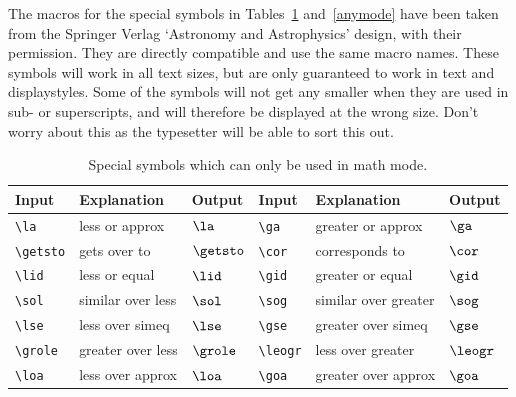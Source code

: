 \documentclass{gji}
\begin{document}
The macros for the special symbols in Tables~\ref{mathmode}
and~\ref{anymode}
have been taken from the Springer Verlag `Astronomy and Astrophysics'
design, with their permission. They are directly compatible and use the
same macro names.
These symbols will work in all text sizes, but are only guaranteed to work
in text and displaystyles. Some of the symbols will not get any smaller
when they are used in sub- or superscripts, and will therefore be
displayed at the wrong size. Don't worry about this as the typesetter
will be able to sort this out.
%
\begin{table}
\begin{minipage}{106mm}
\caption{Special symbols which can only be used in math mode.}
\label{mathmode}
\begin{tabular}{@{}llllll}
Input & Explanation & Output & Input & Explanation & Output\\
\hline
\verb"\la"     & less or approx       & $\la$     &
  \verb"\ga"     & greater or approx    & $\ga$\\[2pt]
\verb"\getsto" & gets over to         & $\getsto$ &
  \verb"\cor"    & corresponds to       & $\cor$\\[2pt]
\verb"\lid"    & less or equal        & $\lid$    &
  \verb"\gid"    & greater or equal     & $\gid$\\[2pt]
\verb"\sol"    & similar over less    & $\sol$    &
  \verb"\sog"    & similar over greater & $\sog$\\[2pt]
\verb"\lse"    & less over simeq      & $\lse$    &
  \verb"\gse"    & greater over simeq   & $\gse$\\[2pt]
\verb"\grole"  & greater over less    & $\grole$  &
  \verb"\leogr"  & less over greater    & $\leogr$\\[2pt]
\verb"\loa"    & less over approx     & $\loa$    &
  \verb"\goa"    & greater over approx  & $\goa$\\
\hline
\end{tabular}
\end{minipage}
\end{table}
%
\end{document}
